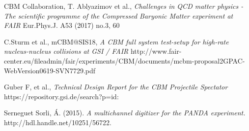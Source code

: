 \documentclass[a4paper,11pt]{article}
\begin{document}
\begin{thebibliography}{99}


CBM Collaboration, T. Ablyazimov et al., \emph{Challenges in QCD matter physics -The scientific programme of the Compressed Baryonic Matter experiment at FAIR} Eur.Phys.J. A53 (2017) no.3, 60 


C.Sturm et al., mCBM@SIS18, \emph{A CBM full system test-setup for high-rate nucleus-nucleus collisions at GSI / FAIR} http://www.fair-center.eu/fileadmin/fair/experiments/CBM/documents/mcbm-proposal2GPAC-WebVersion0619-SVN7729.pdf

Guber F, et al., \emph{Technical Design Report for the CBM Projectile Spectator} https://repository.gsi.de/search?p=id:%

Serneguet Sorli, Á. (2015). \emph{A multichannel digitizer for the PANDA experiment.} http://hdl.handle.net/10251/56722.



\end{thebibliography}
\end{document}
